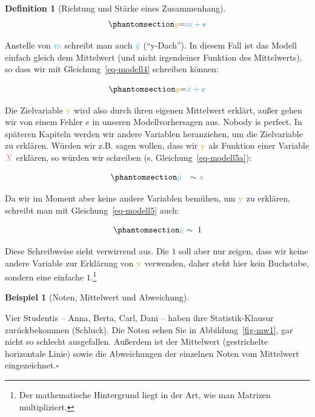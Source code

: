 \documentclass[
  a4paper,
  DIV=11]{scrreprt}
\theoremstyle{definition}
\theoremstyle{definition}
\newtheorem{example}{Beispiel}[chapter]
\theoremstyle{definition}
\newtheorem{definition}{Definition}[chapter]
\theoremstyle{remark}
\begin{document}
\begin{definition}[Richtung und Stärke eines
Zusammenhang]
\begin{equation}\phantomsection\label{eq-modell3}{\color{ycol}{y} \color{black}{ = } \color{modelcol}{\text{m}} + \color{errorcol}{\text{e}}}\end{equation}

Anstelle von \(\color{modelcol}{\text{m}}\) schreibt man auch
\(\color{modelcol}{\hat{y}}\) (``y-Dach''). In diesem Fall ist das
Modell einfach gleich dem Mittelwert (und nicht irgendeiner Funktion des
Mittelwerts), so dass wir mit Gleichung~\ref{eq-modell4} schreiben
können:

\begin{equation}\phantomsection\label{eq-modell4}{\color{ycol}{y}  \color{black}{ = } \color{modelcol}{\bar{x}} + \color{errorcol}{e}}\end{equation}

Die Zielvariable \(\color{ycol}{\text{y}}\) wird also durch ihren
eigenen Mittelwert erklärt, außer gehen wir von einem Fehler \(e\) in
unseren Modellvorhersagen aus. Nobody is perfect. In späteren Kapiteln
werden wir andere Variablen heranziehen, um die Zielvariable zu
erklären. Würden wir z.B. sagen wollen, dass wir
\(\color{ycol}{\text{y}}\) als Funktion einer Variable
\(\color{xcol}{X}\) erklären, so würden wir schreiben (s.
Gleichung~\ref{eq-modell5a}):

\begin{equation}\phantomsection\label{eq-modell5a}{\color{modelcol}{\bar{y}} \color{black} \quad { \sim } \color{xcol}{\text{ x}}}\end{equation}

Da wir im Moment aber keine andere Variablen bemühen, um
\(\color{ycol}{\text{y}}\) zu erklären, schreibt man mit
Gleichung~\ref{eq-modell5} auch:

\begin{equation}\phantomsection\label{eq-modell5}{\color{modelcol}{\bar{y}}\;  \color{black}{\sim \; 1}}\end{equation}

Diese Schreibweise sieht verwirrend aus. Die \(1\) soll aber nur zeigen,
dass wir keine andere Variable zur Erklärung von
\(\color{ycol}{\text{y}}\) verwenden, daher steht hier kein Buchstabe,
sondern eine einfache \(1\).\footnote{Der mathematische Hintergrund
  liegt in der Art, wie man Matrizen multipliziert.}

\begin{example}[Noten, Mittelwert und
Abweichung]\protect\hypertarget{exm-noten}{}\label{exm-noten}

Vier Studentis -- Anna, Berta, Carl, Dani -- haben ihre
Statistik-Klausur zurückbekommen (Schluck). Die Noten sehen Sie in
Abbildung~\ref{fig-mw1}, gar nicht so schlecht ausgefallen. Außerdem ist
der Mittelwert (gestrichelte horizontale Linie) sowie die Abweichungen
der einzelnen Noten vom Mittelwert eingezeichnet.\(\square\)


\end{example}
\end{definition}
\end{document}
